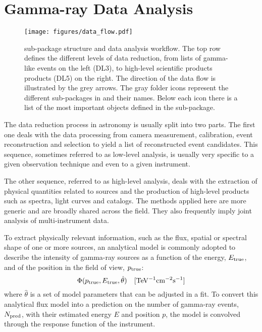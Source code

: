 \documentclass[traditabstract, longauth]{aa}
\begin{document}
\section{Gamma-ray Data Analysis}
\begin{figure*}[h!]
	\centering
	\texttt{[image: figures/data\_flow.pdf]}
	\caption{
		\gammapy sub-package structure and data analysis workflow. The top row
        defines the different levels of data reduction, from lists of gamma-like
        events on the left (DL3), to high-level scientific products products
        (DL5) on the right. The direction of the data flow is illustrated by the
        grey arrows. The gray folder icons represent the different sub-packages
        in \gammapy and their names. Below each icon there is a list of the most
        important objects defined in the sub-package.
    }
	\label{fig:data_flow}
\end{figure*}
%
\label{sec:gammaray-data-analysis}
The data reduction process in \gammaray astronomy is usually split into two parts.
The first one deals with the data processing from camera measurement, calibration, event
reconstruction and selection to yield a list of reconstructed \gammaray event candidates.
This sequence, sometimes referred to as low-level analysis, is usually very specific to
a given observation technique and even to a given instrument.

The other sequence, referred to as high-level analysis, deals with the extraction of physical
quantities related to \gammaray sources and the production of high-level products such as spectra,
light curves and catalogs. The methods applied here are more generic and are broadly
shared across the field. They also frequently imply joint analysis of multi-instrument data.


To extract physically relevant information, such as the flux, spatial or spectral shape of one or more sources,
an analytical model is commonly adopted to describe the intensity of gamma-ray sources as a function of the energy,
$E_{\rm true}$, and of the position in the field of view, $p_{\rm true}$:
$$ \Phi(p_{\rm true}, E_{\rm true}, \hat{\theta}) \quad \mathrm{[TeV^{-1}cm^{-2}s^{-1}]} $$
where $\hat{\theta}$ is a set of model parameters that can be adjusted in a fit. To convert this analytical flux model
into a prediction on the number of gamma-ray events, $N_{\rm pred}$, with their estimated energy $E$ and position $p$, the model
is convolved through the response function of the instrument.
\end{document}
